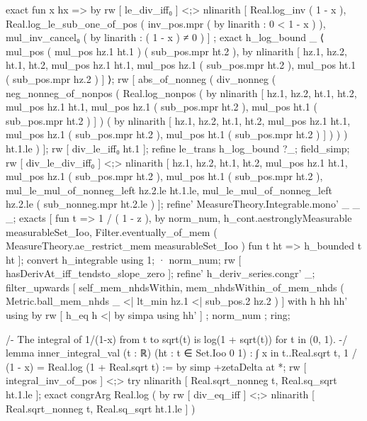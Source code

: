                   exact fun x hx => by rw [ le_div_iff₀ ] <;> nlinarith [ Real.log_inv ( 1 - x ), Real.log_le_sub_one_of_pos ( inv_pos.mpr ( by linarith : 0 < 1 - x ) ), mul_inv_cancel₀ ( by linarith : ( 1 - x ) ≠ 0 ) ] ;
                exact h_log_bound _ ⟨ mul_pos ( mul_pos hz.1 ht.1 ) ( sub_pos.mpr ht.2 ), by nlinarith [ hz.1, hz.2, ht.1, ht.2, mul_pos hz.1 ht.1, mul_pos hz.1 ( sub_pos.mpr ht.2 ), mul_pos ht.1 ( sub_pos.mpr hz.2 ) ] ⟩;
              rw [ abs_of_nonneg ( div_nonneg ( neg_nonneg_of_nonpos ( Real.log_nonpos ( by nlinarith [ hz.1, hz.2, ht.1, ht.2, mul_pos hz.1 ht.1, mul_pos hz.1 ( sub_pos.mpr ht.2 ), mul_pos ht.1 ( sub_pos.mpr ht.2 ) ] ) ( by nlinarith [ hz.1, hz.2, ht.1, ht.2, mul_pos hz.1 ht.1, mul_pos hz.1 ( sub_pos.mpr ht.2 ), mul_pos ht.1 ( sub_pos.mpr ht.2 ) ] ) ) ) ht.1.le ) ];
              rw [ div_le_iff₀ ht.1 ];
              refine le_trans h_log_bound ?_;
              field_simp;
              rw [ div_le_div_iff₀ ] <;> nlinarith [ hz.1, hz.2, ht.1, ht.2, mul_pos hz.1 ht.1, mul_pos hz.1 ( sub_pos.mpr ht.2 ), mul_pos ht.1 ( sub_pos.mpr ht.2 ), mul_le_mul_of_nonneg_left hz.2.le ht.1.le, mul_le_mul_of_nonneg_left hz.2.le ( sub_nonneg.mpr ht.2.le ) ];
            refine' MeasureTheory.Integrable.mono' _ _ _;
            exacts [ fun t => 1 / ( 1 - z ), by norm_num, h_cont.aestronglyMeasurable measurableSet_Ioo, Filter.eventually_of_mem ( MeasureTheory.ae_restrict_mem measurableSet_Ioo ) fun t ht => h_bounded t ht ];
          convert h_integrable using 1;
        · norm_num;
    rw [ hasDerivAt_iff_tendsto_slope_zero ];
    refine' h_deriv_series.congr' _;
    filter_upwards [ self_mem_nhdsWithin, mem_nhdsWithin_of_mem_nhds ( Metric.ball_mem_nhds _ <| lt_min hz.1 <| sub_pos.2 hz.2 ) ] with h hh hh' using by rw [ h_eq h <| by simpa using hh' ] ; norm_num ; ring;

/-
The integral of 1/(1-x) from t to sqrt(t) is log(1 + sqrt(t)) for t in (0, 1).
-/
lemma inner_integral_val (t : ℝ) (ht : t ∈ Set.Ioo 0 1) : ∫ x in t..Real.sqrt t, 1 / (1 - x) = Real.log (1 + Real.sqrt t) := by
  simp +zetaDelta at *;
  rw [ integral_inv_of_pos ] <;> try nlinarith [ Real.sqrt_nonneg t, Real.sq_sqrt ht.1.le ];
  exact congrArg Real.log ( by rw [ div_eq_iff ] <;> nlinarith [ Real.sqrt_nonneg t, Real.sq_sqrt ht.1.le ] )

